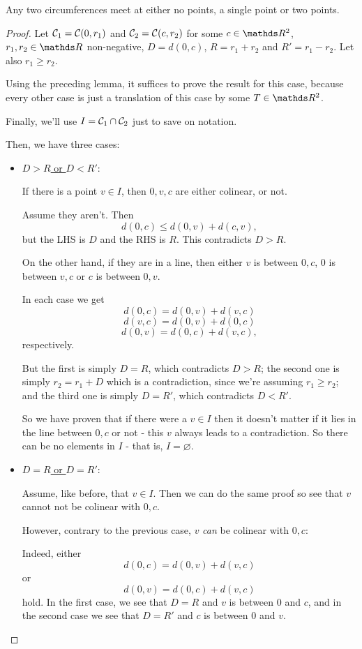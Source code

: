 \begin{cor}
	Any two circumferences meet at either no points, a single point or two points.
\end{cor}
\begin{proof}
	Let $\mathcal C_1=\mathcal C(0,r_1)$ and $\mathcal C_2=\mathcal C(c,r_2)$ for some $c\in \R^2$, $r_1,r_2\in \R$ non-negative, $D=d(0,c)$, $R=r_1+r_2$ and $R'=r_1-r_2$. Let also $r_1\geq r_2$.
	
	Using the preceding lemma, it suffices to prove the result for this case, because every other case is just a translation of this case by some $T\in \R^2$.
	
	Finally, we'll use $I=\mathcal C_1\cap \mathcal C_2$ just to save on notation.
	
	Then, we have three cases:
	\begin{itemize}
		\item \underline{$D>R$ or $D<R'$}:
		
		If there is a point $v\in I$, then $0,v,c$ are either colinear, or not.
		
		Assume they aren't.	Then
		\[d(0,c)\leq d(0,v)+d(c,v),\] but the LHS is $D$ and the RHS is $R$. This contradicts $D>R$.
		
		On the other hand, if they are in a line, then either $v$ is between $0,c$, $0$ is between $v,c$ or $c$ is between $0,v$.
		
		In each case we get
		\[d(0,c)=d(0,v)+d(v,c)\]
		\[d(v,c)=d(0,v)+d(0,c)\]
		\[d(0,v)=d(0,c)+d(v,c),\]respectively.
		
		But the first is simply $D=R$, which contradicts $D>R$; the second one is simply $r_2=r_1+D$ which is a contradiction, since we're assuming $r_1\geq r_2$; and the third one is simply $D=R'$, which contradicts $D<R'$.
		
		So we have proven that if there were a $v\in I$ then it doesn't matter if it lies in the line between $0,c$ or not - this $v$ always leads to a contradiction. So there can be no elements in $I$ - that is, $I=\varnothing$.
		
		\item \underline{$D=R$ or $D=R'$}:
		
		Assume, like before, that $v\in I$. Then we can do the same proof so see that $v$ cannot not be colinear with $0,c$.
		
		However, contrary to the previous case, $v$ \textit{can} be colinear with $0,c$:
		
		Indeed, either		
		\[d(0,c)=d(0,v)+d(v,c)\]or
		\[d(0,v)=d(0,c)+d(v,c)\]hold. In the first case, we see that $D=R$ and $v$ is between $0$ and $c$, and in the second case we see that $D=R'$ and $c$ is between $0$ and $v$.
		

\end{itemize}
\end{proof}
